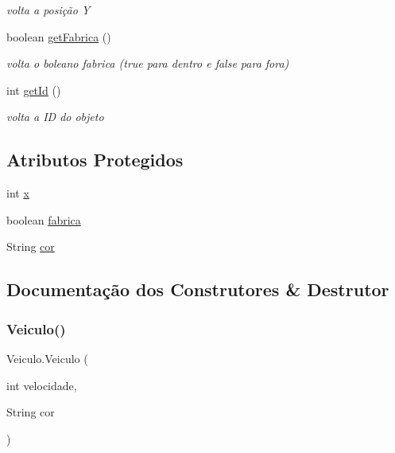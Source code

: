 \begin{DoxyCompactItemize}
\begin{DoxyCompactList}\small\item\em volta a posição Y \end{DoxyCompactList}\item 
boolean \mbox{\hyperlink{class_veiculo_a6447f0eeb99399f1f96e835c22a88479}{get\+Fabrica}} ()
\begin{DoxyCompactList}\small\item\em volta o boleano fabrica (true para dentro e false para fora) \end{DoxyCompactList}\item 
int \mbox{\hyperlink{class_veiculo_a09c389362736b3ca90a0200e01545e73}{get\+Id}} ()
\begin{DoxyCompactList}\small\item\em volta a ID do objeto \end{DoxyCompactList}\end{DoxyCompactItemize}
\subsection*{Atributos Protegidos}
\begin{DoxyCompactItemize}
\item 
int \mbox{\hyperlink{class_veiculo_a069917a284297fe5b385258b2afd9ad6}{x}}
\item 
boolean \mbox{\hyperlink{class_veiculo_a23d377a69bdf558ebedb5bc35dcdebf5}{fabrica}}
\item 
String \mbox{\hyperlink{class_veiculo_a6bc5886e61340672e69bd638936ec1d5}{cor}}
\end{DoxyCompactItemize}


\subsection{Documentação dos Construtores \& Destrutor}
\mbox{\label{class_veiculo_a6e43a5035741a90e4ef9d07b7fce6c87}} 
\subsubsection{\texorpdfstring{Veiculo()}{Veiculo()}}
{\footnotesize\ttfamily Veiculo.\+Veiculo (\begin{DoxyParamCaption}\item[{int}]{velocidade,  }\item[{String}]{cor }\end{DoxyParamCaption})}



